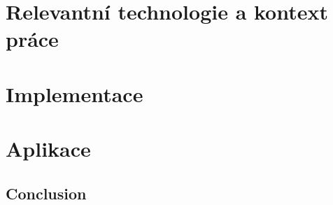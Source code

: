 \documentclass{ctuthesis}
\begin{document}
\maketitle



\part{Relevantní technologie a kontext práce}




\part{Implementace}

\part{Aplikace}

\chapter{Conclusion}

\appendix

\printbibliography[title={Seznam literatury}]
\end{document}
